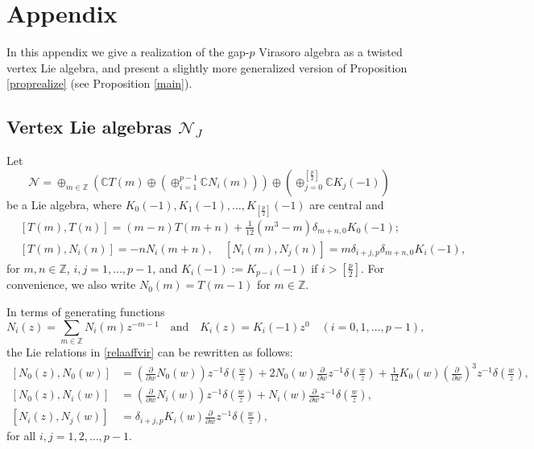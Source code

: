\documentclass[12pt, reqno]{amsart}
\numberwithin{equation}{section}
\numberwithin{equation}{section}
\def\({\left(}
\def\){\right)}
\def\p{\partial}
\newcommand{\C}{\mathbb C}
\newcommand{\Z}{\mathbb{Z}}
\begin{document}
\section{Appendix}

In this appendix we give a realization of the gap-$p$ Virasoro algebra as a twisted vertex Lie algebra, and present a slightly more generalized version of Proposition \ref{proprealize} (see Proposition \ref{main}).


\subsection{Vertex Lie algebras $\mathcal{N}_J$}
Let
\[\mathcal{N}=\oplus_{m\in \Z}\(\C T(m) \oplus
(\oplus_{i=1}^{p-1} \C N_i(m))\)\oplus\(\oplus_{j=0}^{[\frac{p}{2}]}\C K_j(-1)\)  \] be a Lie algebra,
where $K_0(-1),K_1(-1),\dots,K_{[\frac{p}{2}]}(-1)$ are central and
\begin{equation}\label{relaaffvir}
	\begin{aligned}
	&[T(m),T(n)]=(m-n)T(m+n)+\frac{1}{12}(m^{3}-m)\delta_{m+n,0}K_{0}(-1);\\
		&[T(m),N_{i}(n)]=-n N_{i}(m+n),\quad
[N_{i}(m),N_{j}(n)]=m\delta_{i+j,p}\delta_{m+n,0}K_{i}(-1),
	\end{aligned}
\end{equation}
for $m,n\in\Z$, $i,j=1,\ldots,p-1$, and
$K_{i}(-1):=K_{p-i}(-1)$ if $i>[\frac{p}{2}]$.
For convenience, we also write $N_0(m)=T(m-1)$ for $m\in \Z$.


In terms of generating functions
\[
N_i(z)=\sum_{m\in \Z} N_i(m) z^{-m-1}\quad \text{and}\quad
K_i(z)=K_i(-1)z^0\quad (i=0,1,\dots,p-1),
\]
the Lie relations in \eqref{relaaffvir} can be rewritten as follows:
\begin{equation*}
\begin{split}%
 [N_0(z),N_0(w)]&=\(\frac{\p}{\p w}N_0(w)\)z^{-1}\delta\(\frac{w}{z}\)
      +2 N_0(w)\frac{\p}{\p w}z^{-1}\delta\(\frac{w}{z}\)
      +\frac{1}{12}K_0(w)\(\frac{\p}{\p w}\)^3z^{-1}\delta\(\frac{w}{z}\),\\
 [N_0(z),N_i(w)]&=\(\frac{\p}{\p w}N_i(w)\)z^{-1}\delta\(\frac{w}{z}\)
     +N_i(w)\frac{\p}{\p w}z^{-1}\delta\(\frac{w}{z}\),\\
 [N_i(z),N_j(w)]&=\delta_{i+j,p}K_i(w)\frac{\p}{\p w}z^{-1}\delta\(\frac{w}{z}\),
\end{split}
\end{equation*}
for all $i,j=1,2,\dots,p-1$.
\end{document}
